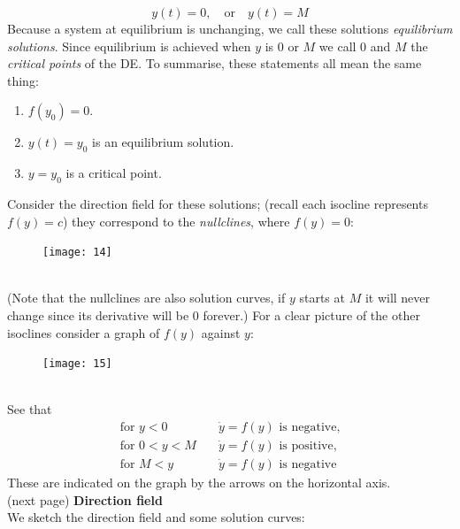 \documentclass{report}
\begin{document}
\begin{equation*}
y(t)=0,\quad\text{or}\quad y(t)=M
\end{equation*}
Because a system at equilibrium is unchanging, we call these solutions \textit{equilibrium solutions}. 
Since equilibrium is achieved when $y$ is $0$ or $M$ we call $0$ and $M$ the \textit{critical points} of the DE. 
To summarise, these statements all mean the same thing:
\begin{enumerate}
\item $f(y_0)=0$.
\item $y(t)=y_0$ is an equilibrium solution.
\item $y=y_0$ is a critical point.
\end{enumerate}
Consider the direction field for these solutions; (recall each isocline represents $f(y)=c$) they correspond to the
\textit{nullclines}, where $f(y)=0$:
\begin{figure}[h]
\begin{center}
\texttt{[image: 14]}\\
\end{center}
\end{figure}\\
(Note that the nullclines are also solution curves, if $y$ starts at $M$ it will never change since its
derivative will be 0 forever.) For a clear picture of the other isoclines consider
a graph of $f(y)$ against $y$:
\begin{figure}[h]
\begin{center}
\texttt{[image: 15]}\\
\end{center}
\end{figure}\\
See that 
\begin{align*}
\text{for }y<0\quad&\dot{y}=f(y)\text{ is negative,}\\
\text{for }0<y<M\quad&\dot{y}=f(y)\text{ is positive,}\\
\text{for }M<y\quad&\dot{y}=f(y)\text{ is negative}
\end{align*}
These are indicated on the graph by the arrows on the horizontal axis.\\
(next page)
\newpage
\noindent\textbf{Direction field}\\
We sketch the direction field and some solution curves:
\end{document}
